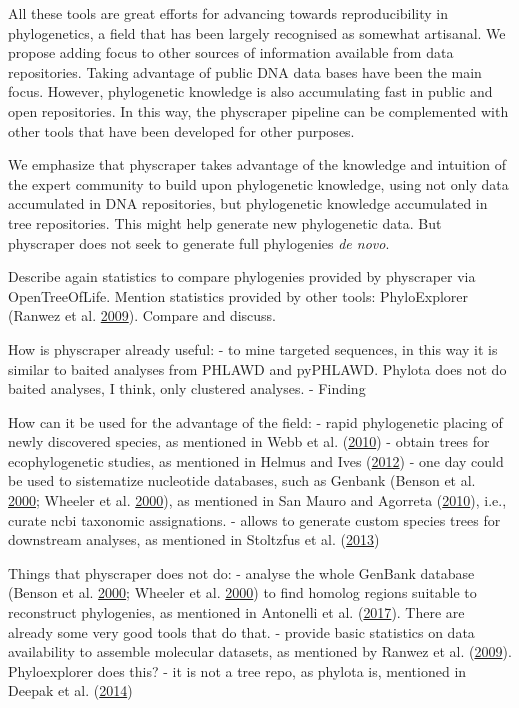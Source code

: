 \documentclass[]{article}
\begin{document}
All these tools are great efforts for advancing towards reproducibility in phylogenetics,
a field that has been largely recognised as somewhat artisanal.
We propose adding focus to other sources of information available from data repositories.
Taking advantage of public DNA data bases have been the main focus. However, phylogenetic knowledge is
also accumulating fast in public and open repositories.
In this way, the physcraper pipeline can be complemented with other tools that have
been developed for other purposes.

We emphasize that physcraper takes advantage of the knowledge and intuition of the expert
community to build upon phylogenetic knowledge, using not only data accumulated in
DNA repositories, but phylogenetic knowledge accumulated in tree repositories.
This might help generate new phylogenetic data. But physcraper does not seek to generate full phylogenies \emph{de novo}.

Describe again statistics to compare phylogenies provided by physcraper via OpenTreeOfLife.
Mention statistics provided by other tools: PhyloExplorer (Ranwez et al. \protect\hyperlink{ref-ranwez2009phyloexplorer}{2009}).
Compare and discuss.

How is physcraper already useful:
- to mine targeted sequences, in this way it is similar to baited analyses from PHLAWD and pyPHLAWD. Phylota does not do baited analyses, I think, only clustered analyses.
- Finding

How can it be used for the advantage of the field:
- rapid phylogenetic placing of newly discovered species, as mentioned in Webb et al. (\protect\hyperlink{ref-webb2010biodiversity}{2010})
- obtain trees for ecophylogenetic studies, as mentioned in Helmus and Ives (\protect\hyperlink{ref-helmus2012phylogenetic}{2012})
- one day could be used to sistematize nucleotide databases, such as Genbank (Benson et al. \protect\hyperlink{ref-benson2000genbank}{2000}; Wheeler et al. \protect\hyperlink{ref-wheeler2000database}{2000}), as mentioned in San Mauro and Agorreta (\protect\hyperlink{ref-san2010molecular}{2010}), i.e., curate ncbi taxonomic assignations.
- allows to generate custom species trees for downstream analyses, as mentioned in Stoltzfus et al. (\protect\hyperlink{ref-stoltzfus2013phylotastic}{2013})

Things that physcraper does not do:
- analyse the whole GenBank database (Benson et al. \protect\hyperlink{ref-benson2000genbank}{2000}; Wheeler et al. \protect\hyperlink{ref-wheeler2000database}{2000}) to find homolog regions suitable to reconstruct phylogenies, as mentioned in Antonelli et al. (\protect\hyperlink{ref-antonelli2017toward}{2017}). There are already some very good tools that do that.
- provide basic statistics on data availability to assemble molecular datasets, as mentioned by Ranwez et al. (\protect\hyperlink{ref-ranwez2009phyloexplorer}{2009}). Phyloexplorer does this?
- it is not a tree repo, as phylota is, mentioned in Deepak et al. (\protect\hyperlink{ref-deepak2014evominer}{2014})
\end{document}
